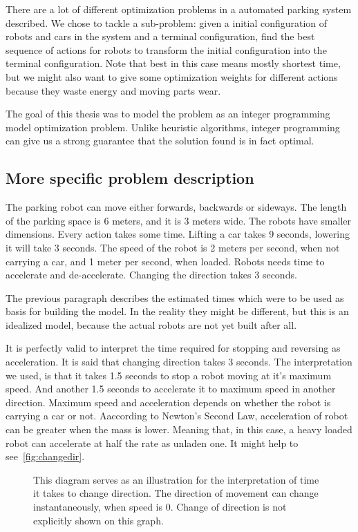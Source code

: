There are a lot of different optimization problems in a automated parking system
described. We chose to tackle a sub-problem: given a initial configuration of
robots and cars in the system and a terminal configuration, find the best
sequence of actions for robots to transform the initial configuration into the
terminal configuration. Note that best in this case means mostly shortest time,
but we might also want to give some optimization weights for different actions because 
they waste energy and moving parts wear.

The goal of this thesis was to model the problem as an integer programming
model optimization problem. Unlike heuristic algorithms, integer programming
can give us a strong guarantee that the solution found is in fact optimal.

\subsection{More specific problem description}
The parking robot can move either forwards, backwards or sideways. The length of
the parking space is 6 meters, and it is 3 meters wide. The robots have smaller
dimensions. Every action takes some time. Lifting a car takes 9 seconds,
lowering it will take 3 seconds. The speed of the robot is 2 meters per second,
when not carrying a car, and 1 meter per second, when loaded. Robots needs time
to accelerate and de-accelerate. Changing the direction takes 3 seconds.

The previous paragraph describes the estimated times which were to be used as
basis for building the model. In the reality they might be different, but this
is an idealized model, because the actual robots are not yet built after all.

It is perfectly valid to interpret the time required for stopping and reversing as acceleration. 
It is said that changing direction takes 3 seconds. The interpretation we used, is
that it takes 1.5 seconds to stop a robot moving at it's maximum speed. And
another 1.5 seconds to accelerate it to maximum speed in another direction.
Maximum speed and acceleration depends on whether the robot is carrying a car or not.
Aaccording to Newton's Second Law, acceleration of robot can be greater when the mass is lower. Meaning that, in this case, a heavy loaded robot can
accelerate at half the rate as unladen one. It might help to
see~\autoref{fig:changedir}.

\begin{figure}[h]
    \begin{center}
        
        \caption{This diagram serves as an illustration for the interpretation of
            time it takes to change direction. The direction of movement can change
            instantaneously, when speed is 0. Change of direction is not explicitly shown on
            this graph.}
        \label{fig:changedir}
    \end{center}
\end{figure}

